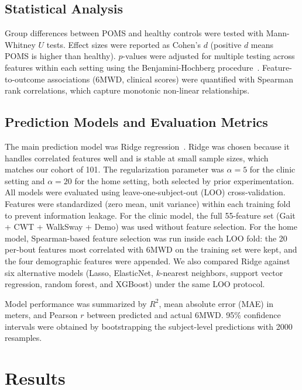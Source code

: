 \documentclass{article}
\begin{document}
\subsection{Statistical Analysis}\label{sec:stats}

Group differences between POMS and healthy controls were tested with Mann-Whitney $U$ tests. Effect sizes were reported as Cohen's $d$ (positive $d$ means POMS is higher than healthy). $p$-values were adjusted for multiple testing across features within each setting using the Benjamini-Hochberg procedure~\cite{benjamini1995controlling}. Feature-to-outcome associations (6MWD, clinical scores) were quantified with Spearman rank correlations, which capture monotonic non-linear relationships.

\subsection{Prediction Models and Evaluation Metrics}\label{sec:models}

The main prediction model was Ridge regression~\cite{hoerl1970ridge}. Ridge was chosen because it handles correlated features well and is stable at small sample sizes, which matches our cohort of 101. The regularization parameter was $\alpha = 5$ for the clinic setting and $\alpha = 20$ for the home setting, both selected by prior experimentation. All models were evaluated using leave-one-subject-out (LOO) cross-validation. Features were standardized (zero mean, unit variance) within each training fold to prevent information leakage. For the clinic model, the full 55-feature set (Gait + CWT + WalkSway + Demo) was used without feature selection. For the home model, Spearman-based feature selection was run inside each LOO fold: the 20 per-bout features most correlated with 6MWD on the training set were kept, and the four demographic features were appended. We also compared Ridge against six alternative models (Lasso, ElasticNet, $k$-nearest neighbors, support vector regression, random forest, and XGBoost) under the same LOO protocol.

Model performance was summarized by $R^2$, mean absolute error (MAE) in meters, and Pearson $r$ between predicted and actual 6MWD. 95\% confidence intervals were obtained by bootstrapping the subject-level predictions with 2000 resamples.


\section{Results}\label{sec:results}
\end{document}
